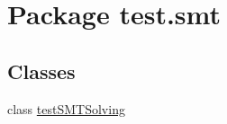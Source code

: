 \hypertarget{namespacetest_1_1smt}{}\section{Package test.\+smt}
\label{namespacetest_1_1smt}
\subsection*{Classes}
\begin{DoxyCompactItemize}
\item 
class \hyperlink{classtest_1_1smt_1_1test_s_m_t_solving}{test\+S\+M\+T\+Solving}
\end{DoxyCompactItemize}
